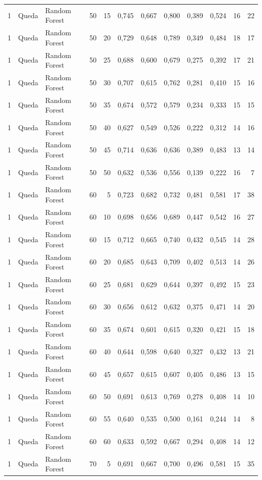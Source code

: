 \begin{longtable}{@{}rllrrrrrrrrr@{}}
1 & Queda & Random Forest & 50 & 15 & 0,745 & 0,667 & 0,800 & 0,389 & 0,524 & 16 & 22 \\
1 & Queda & Random Forest & 50 & 20 & 0,729 & 0,648 & 0,789 & 0,349 & 0,484 & 18 & 17 \\
1 & Queda & Random Forest & 50 & 25 & 0,688 & 0,600 & 0,679 & 0,275 & 0,392 & 17 & 21 \\
1 & Queda & Random Forest & 50 & 30 & 0,707 & 0,615 & 0,762 & 0,281 & 0,410 & 15 & 16 \\
1 & Queda & Random Forest & 50 & 35 & 0,674 & 0,572 & 0,579 & 0,234 & 0,333 & 15 & 15 \\
1 & Queda & Random Forest & 50 & 40 & 0,627 & 0,549 & 0,526 & 0,222 & 0,312 & 14 & 16 \\
1 & Queda & Random Forest & 50 & 45 & 0,714 & 0,636 & 0,636 & 0,389 & 0,483 & 13 & 14 \\
1 & Queda & Random Forest & 50 & 50 & 0,632 & 0,536 & 0,556 & 0,139 & 0,222 & 16 & 7 \\
1 & Queda & Random Forest & 60 & 5 & 0,723 & 0,682 & 0,732 & 0,481 & 0,581 & 17 & 38 \\
1 & Queda & Random Forest & 60 & 10 & 0,698 & 0,656 & 0,689 & 0,447 & 0,542 & 16 & 27 \\
1 & Queda & Random Forest & 60 & 15 & 0,712 & 0,665 & 0,740 & 0,432 & 0,545 & 14 & 28 \\
1 & Queda & Random Forest & 60 & 20 & 0,685 & 0,643 & 0,709 & 0,402 & 0,513 & 14 & 26 \\
1 & Queda & Random Forest & 60 & 25 & 0,681 & 0,629 & 0,644 & 0,397 & 0,492 & 15 & 23 \\
1 & Queda & Random Forest & 60 & 30 & 0,656 & 0,612 & 0,632 & 0,375 & 0,471 & 14 & 20 \\
1 & Queda & Random Forest & 60 & 35 & 0,674 & 0,601 & 0,615 & 0,320 & 0,421 & 15 & 18 \\
1 & Queda & Random Forest & 60 & 40 & 0,644 & 0,598 & 0,640 & 0,327 & 0,432 & 13 & 21 \\
1 & Queda & Random Forest & 60 & 45 & 0,657 & 0,615 & 0,607 & 0,405 & 0,486 & 13 & 15 \\
1 & Queda & Random Forest & 60 & 50 & 0,691 & 0,613 & 0,769 & 0,278 & 0,408 & 14 & 10 \\
1 & Queda & Random Forest & 60 & 55 & 0,640 & 0,535 & 0,500 & 0,161 & 0,244 & 14 & 8 \\
1 & Queda & Random Forest & 60 & 60 & 0,633 & 0,592 & 0,667 & 0,294 & 0,408 & 14 & 12 \\
1 & Queda & Random Forest & 70 & 5 & 0,691 & 0,667 & 0,700 & 0,496 & 0,581 & 15 & 35 \\

\end{longtable}
